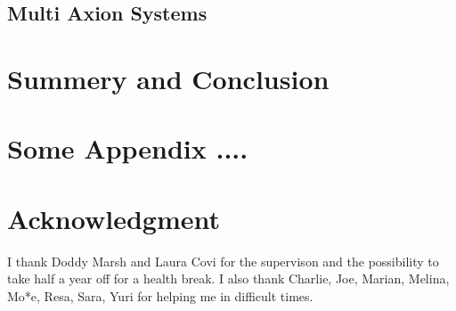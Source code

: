 \documentclass[master,       %
               twoside,        %
               BCOR10mm,       %
               english,ngerman, %
               ]{GAUBM}
\begin{document}
\begin{otherlanguage}{english}
\section{Multi Axion Systems}

\chapter{Summery and Conclusion}


\appendix

\chapter{Some Appendix ....}

\cleardoublepage


\chapter*{Acknowledgment}
I thank Doddy Marsh and Laura Covi for the supervison and the possibility to take half a year off for a health break. 
I also thank Charlie, Joe, Marian, Melina, Mo*e, Resa, Sara, Yuri for helping me in difficult times.

\end{otherlanguage}
\Declaration
\end{document}
